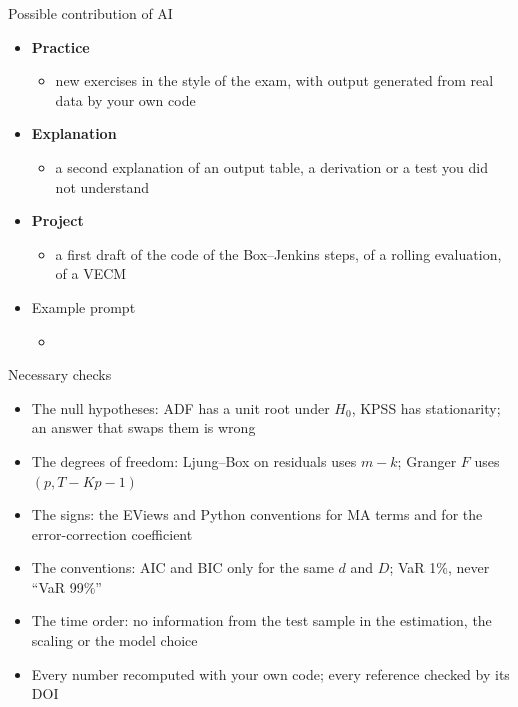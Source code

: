 \begin{frame}{Possible contribution of AI}
\itemsize{\small}
\begin{itemize}
    \item \textbf{Practice}
    \begin{itemize}
        \item new exercises in the style of the exam, with output generated from real data by your own code
    \end{itemize}
    \item \textbf{Explanation}
    \begin{itemize}
        \item a second explanation of an output table, a derivation or a test you did not understand
    \end{itemize}
    \item \textbf{Project}
    \begin{itemize}
        \item a first draft of the code of the Box--Jenkins steps, of a rolling evaluation, of a VECM
    \end{itemize}
    \item Example prompt
    \begin{itemize}
        \item {}
    \end{itemize}
\end{itemize}
\end{frame}

\begin{frame}{Necessary checks}
\itemsize{\small}
\begin{itemize}
    \item The null hypotheses: ADF has a unit root under $H_0$, KPSS has stationarity; an answer that swaps them is wrong
    \item The degrees of freedom: Ljung--Box on residuals uses $m - k$; Granger $F$ uses $(p, T - Kp - 1)$
    \item The signs: the EViews and Python conventions for MA terms and for the error-correction coefficient
    \item The conventions: AIC and BIC only for the same $d$ and $D$; VaR 1\%, never ``VaR 99\%''
    \item The time order: no information from the test sample in the estimation, the scaling or the model choice
    \item Every number recomputed with your own code; every reference checked by its DOI
\end{itemize}
\end{frame}


